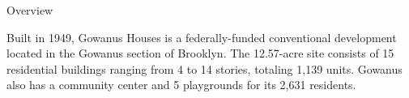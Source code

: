 Overview 

Built in 1949, Gowanus Houses is a federally-funded conventional development located in the Gowanus section of Brooklyn. The 12.57-acre site consists of 15 residential buildings ranging from 4 to 14 stories, totaling 1,139 units. Gowanus also has a community center and 5 playgrounds for its 2,631 residents. 